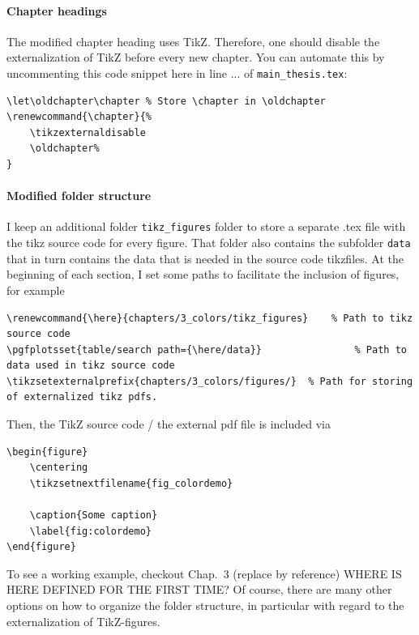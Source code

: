 \paragraph{Chapter headings} The modified chapter heading uses TikZ. Therefore, one should disable the externalization of TikZ before every new chapter. You can automate this by uncommenting this code snippet here in line ... of \verb|main_thesis.tex|:
\begin{lstlisting}
\let\oldchapter\chapter	% Store \chapter in \oldchapter
\renewcommand{\chapter}{%
	\tikzexternaldisable
	\oldchapter%
}
\end{lstlisting}
\paragraph{Modified folder structure}
I keep an additional folder \verb|tikz_figures| folder to store a separate .tex file with the tikz source code for every figure. That folder also contains the subfolder \verb|data| that in turn contains the data that is needed in the source code tikzfiles. At the beginning of each section, I set some paths to facilitate the inclusion of figures, for example
\begin{lstlisting}
\renewcommand{\here}{chapters/3_colors/tikz_figures}	% Path to tikz source code
\pgfplotsset{table/search path={\here/data}}				% Path to data used in tikz source code
\tikzsetexternalprefix{chapters/3_colors/figures/}	% Path for storing of externalized tikz pdfs.
\end{lstlisting}
Then, the TikZ source code / the external pdf file is included via
\begin{lstlisting}
\begin{figure}
	\centering
	\tikzsetnextfilename{fig_colordemo}
	
	\caption{Some caption}
	\label{fig:colordemo}
\end{figure}
\end{lstlisting}
To see a working example, checkout Chap.~3 (replace by reference)
WHERE IS HERE DEFINED FOR THE FIRST TIME?
Of course, there are many other options on how to organize the folder structure, in particular with regard to the externalization of TikZ-figures.




